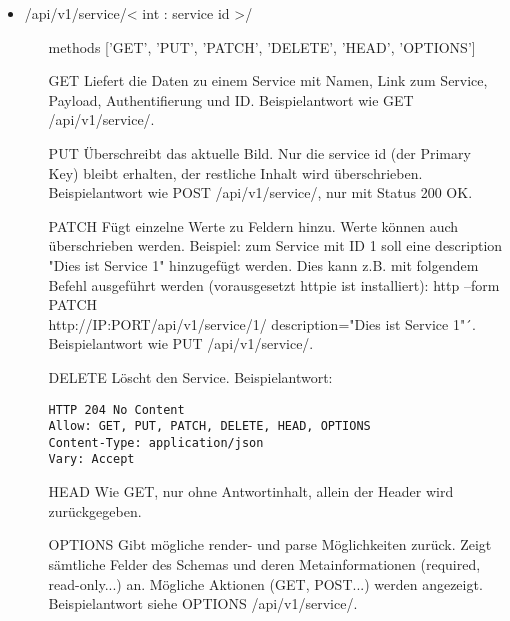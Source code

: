 \begin{itemize}[align=parleft, labelsep=2cm, label={}, leftmargin=1cm]
\begin{enumerate}[align=parleft, labelsep=*, leftmargin=*]
\begin{verbatim}
                    {
                        "value": "GCV",
                        "display_name": "Google Cloud Vision label detection"
                    },
                    {
                        "value": "AWS",
                        "display_name": "AWS Rekognition label detection"
                    },
                    {
                        "value": "OTHER",
                        "display_name": "Other"
                    }
                ]
            }
            ...
\end{verbatim}
	\end{enumerate}
    \item \textcolor{mypink1}{/api/v1/service/< int : service id >/} 
	\begin{enumerate}[align=parleft, labelsep=*, leftmargin=*]
		\item[methods] ['GET', 'PUT', 'PATCH', 'DELETE', 'HEAD', 'OPTIONS']
        \item[GET] Liefert die Daten zu einem Service mit Namen, Link zum Service, Payload, Authentifierung und ID. Beispielantwort wie GET /api/v1/service/.
        \item[PUT] Überschreibt das aktuelle Bild. Nur die service id (der Primary Key) bleibt erhalten, der restliche Inhalt wird überschrieben. Beispielantwort wie POST /api/v1/service/, nur mit Status 200 OK.
        \item[PATCH] Fügt einzelne Werte zu Feldern hinzu. Werte können auch überschrieben werden. Beispiel: zum Service mit ID 1 soll eine description "Dies ist Service 1" hinzugefügt werden. Dies kann z.B. mit folgendem Befehl ausgeführt werden (vorausgesetzt httpie ist installiert): 
http --form PATCH\\
http://IP:PORT/api/v1/service/1/ description="Dies ist Service 1"´. Beispielantwort wie PUT /api/v1/service/.
		\item[DELETE] Löscht den Service. Beispielantwort:
	                        \begin{verbatim}
HTTP 204 No Content
Allow: GET, PUT, PATCH, DELETE, HEAD, OPTIONS
Content-Type: application/json
Vary: Accept
        \end{verbatim}	
        \item[HEAD] Wie GET, nur ohne Antwortinhalt, allein der Header wird zurückgegeben.
        \item[OPTIONS] Gibt mögliche render- und parse Möglichkeiten zurück. Zeigt sämtliche Felder des Schemas und deren Metainformationen (required, read-only...) an. Mögliche Aktionen (GET, POST...) werden angezeigt. Beispielantwort siehe OPTIONS /api/v1/service/.
        \end{enumerate}
     

\end{itemize}
